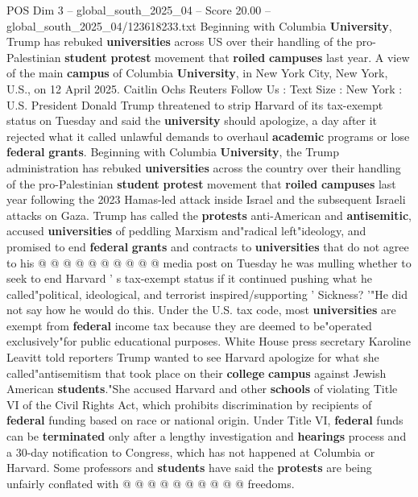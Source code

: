 \begin{textsample}{POS Dim 3 – global\_south\_2025\_04 – Score 20.00 – global\_south\_2025\_04/123618233.txt}  \label{ex:f3_pos_119}
Beginning with Columbia \textbf{University}, Trump has rebuked \textbf{universities} across US over their handling of the pro-Palestinian \textbf{student} \textbf{protest} movement that \textbf{roiled} \textbf{campuses} last year.
A view of the main \textbf{campus} of Columbia \textbf{University}, in New York City, New York, U.S., on 12 April 2025.
Caitlin Ochs Reuters Follow Us : Text Size : New York : U.S.
President Donald Trump threatened to strip Harvard of its tax-exempt status on Tuesday and said the \textbf{university} should apologize, a day after it rejected what it called unlawful demands to overhaul \textbf{academic} programs or lose \textbf{federal} \textbf{grants}.
Beginning with Columbia \textbf{University}, the Trump administration has rebuked \textbf{universities} across the country over their handling of the pro-Palestinian \textbf{student} \textbf{protest} movement that \textbf{roiled} \textbf{campuses} last year following the 2023 Hamas-led attack inside Israel and the subsequent Israeli attacks on Gaza.
Trump has called the \textbf{protests} anti-American and \textbf{antisemitic}, accused \textbf{universities} of peddling Marxism and"radical left"ideology, and promised to end \textbf{federal} \textbf{grants} and contracts to \textbf{universities} that do not agree to his @ @ @ @ @ @ @ @ @ @ media post on Tuesday he was mulling whether to seek to end Harvard ' s tax-exempt status if it continued pushing what he called"political, ideological, and terrorist inspired/supporting ' Sickness? '"He did not say how he would do this.
Under the U.S. tax code, most \textbf{universities} are exempt from \textbf{federal} income tax because they are deemed to be"operated exclusively"for public educational purposes.
White House press secretary Karoline Leavitt told reporters Trump wanted to see Harvard apologize for what she called"antisemitism that took place on their \textbf{college} \textbf{campus} against Jewish American \textbf{students}."She accused Harvard and other \textbf{schools} of violating Title VI of the Civil Rights Act, which prohibits discrimination by recipients of \textbf{federal} funding based on race or national origin.
Under Title VI, \textbf{federal} funds can be \textbf{terminated} only after a lengthy investigation and \textbf{hearings} process and a 30-day notification to Congress, which has not happened at Columbia or Harvard.
Some professors and \textbf{students} have said the \textbf{protests} are being unfairly conflated with @ @ @ @ @ @ @ @ @ @ freedoms.

\end{textsample}
